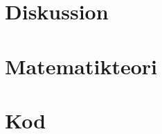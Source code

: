 \documentclass[a4paper]{report}
\begin{document}
\newpage
\chapter{Diskussion}
\label{sec:diskussion}







\newpage
\nocite{*}
\printbibliography

\appendix
\newpage
\chapter{Matematikteori}

\chapter{Kod}


\end{document}
